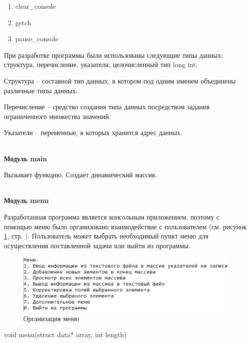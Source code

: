 \begin{enumerate}
    \item clear\_console
    \item getch
    \item pause\_console
\end{enumerate}

При разработке программы были использованы следующие типы данных: структура, перечисление, указатели, целочисленный тип long int.

Структура – составной тип данных, в котором под одним именем объединены различные типы данных.

Перечисление – средство создания типа данных посредством задания ограниченного множества значений.

Указатели – переменные, в которых хранится адрес данных.

\hspace{0pt}\\



\textbf{Модуль main}

Вызывает функцию. Создает динамический массив.

\hspace{0pt}\\



\textbf{Модуль menu}

Разработанная программа является консольным приложением, поэтому с помощью меню было организовано взаимодействие с пользователем (см. рисунок \ref{fig:menu}, стр. \pageref{fig:menu}). Пользователь может выбрать необходимый пункт меню для осуществления поставленной задачи или выйти из программы.

\begin{figure}[!hp]
    \begin{center}
        \includegraphics[width=14cm]{../includes_PZ/programmDevelopment/menu.png}
    \end{center}
    \caption{Организация меню \label{fig:menu}}
\end{figure}

void menu(struct data* array, int length)

